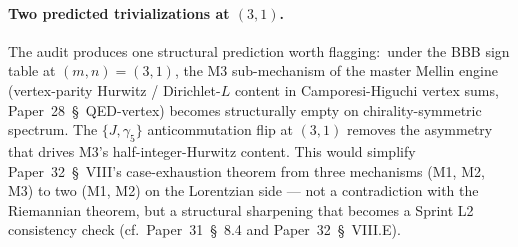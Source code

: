 \documentclass[11pt]{article}
\begin{document}
\paragraph{Two predicted trivializations at $(3, 1)$.}
The audit produces one structural prediction worth flagging:\
under the BBB sign table at $(m, n) = (3, 1)$, the M3 sub-mechanism
of the master Mellin engine (vertex-parity Hurwitz / Dirichlet-$L$
content in Camporesi-Higuchi vertex sums, Paper~28~\S~QED-vertex)
becomes structurally empty on chirality-symmetric spectrum.  The
$\{J, \gamma_5\}$ anticommutation flip at $(3, 1)$ removes the
asymmetry that drives M3's half-integer-Hurwitz content.  This would
simplify Paper~32~\S~VIII's case-exhaustion theorem from three
mechanisms (M1, M2, M3) to two (M1, M2) on the Lorentzian side ---
not a contradiction with the Riemannian theorem, but a structural
sharpening that becomes a Sprint L2 consistency check
(cf.~Paper~31~\S~8.4 and Paper~32~\S~VIII.E).
\end{document}
